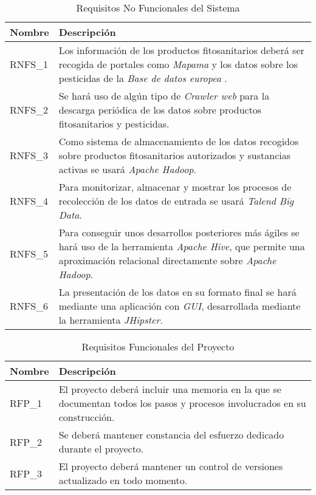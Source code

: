 \begin{table}[!b]
\centering
\bgroup
\def\arraystretch{1.3}
\begin{tabular}{l p{13cm}}
\toprule
\textbf{Nombre} & \textbf{Descripción} \\
 \midrule
RNFS\_1 & 
Los información de los productos fitosanitarios deberá ser recogida de portales como \textit{Mapama} \cite{mapama} y los datos sobre los pesticidas de la \textit{Base de datos europea} \cite{pesticides_eu}.
 \\
RNFS\_2 & 
Se hará uso de algún tipo de \textit{Crawler web} \cite{wikicrawler} para la descarga periódica de los datos sobre productos fitosanitarios y pesticidas.
 \\
RNFS\_3 & 
Como sistema de almacenamiento de los datos recogidos sobre productos fitosanitarios autorizados y sustancias activas se usará \textit{Apache Hadoop}.
 \\
RNFS\_4 & 
Para monitorizar, almacenar y mostrar los procesos de recolección de los datos de entrada se usará \textit{Talend Big Data}. 
 \\
RNFS\_5 & 
Para conseguir unos desarrollos posteriores más ágiles se hará uso de la herramienta \textit{Apache Hive}, que permite una aproximación relacional directamente sobre \textit{Apache Hadoop}.
 \\
RNFS\_6 & 
La presentación de los datos en su formato final se hará mediante una aplicación con \textit{GUI}, desarrollada mediante la herramienta \textit{JHipster}.
 \\
\bottomrule
\end{tabular}
\egroup
\caption{Requisitos No Funcionales del Sistema}
\label{tab:req_no_func_sist}
\end{table}
\begin{table}[!t]
\centering
\bgroup
\def\arraystretch{1.3}
\begin{tabular}{l p{13cm}}
\toprule
\textbf{Nombre} & \textbf{Descripción} \\
 \midrule
RFP\_1 & 
El proyecto deberá incluir una memoria en la que se documentan todos los pasos y procesos involucrados en su construcción.
 \\
RFP\_2 & 
Se deberá mantener constancia del esfuerzo dedicado durante el proyecto.
 \\
RFP\_3 &
El proyecto deberá mantener un control de versiones actualizado en todo momento. 
 \\
\bottomrule
\end{tabular}
\egroup
\caption{Requisitos Funcionales del Proyecto}
\label{tab:req_func_proy}
\end{table}












 


















